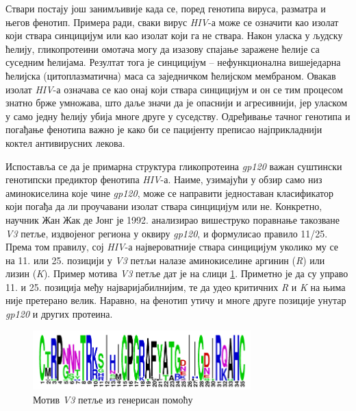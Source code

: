 \documentclass[12pt,oneside]{memoir}
\begin{document}
Ствари постају још занимљивије када се, поред генотипа вируса, разматра и његов фенотип. Примера ради, сваки вирус \textit{HIV}-а може се означити као изолат који ствара синцицијум или као изолат који га не ствара. Након уласка у људску ћелију, гликопротеини омотача могу да изазову спајање заражене ћелије са суседним ћелијама. Резултат тога је синцицијум -- нефункционална вишеједарна ћелијска (цитоплазматична) маса са заједничком ћелијском мембраном. Овакав изолат \textit{HIV}-а означава се као онај који ствара синцицијум и он се тим процесом знатно брже умножава, што даље значи да је опаснији и агресивнији, јер уласком у само једну ћелију убија многе друге у суседству. Одређивање тачног генотипа и погађање фенотипа важно је како би се пацијенту преписао најприкладнији коктел антивирусних лекова.

Испоставља се да је примарна структура гликопротеина \textit{gp120} важан суштински генотипски предиктор фенотипа \textit{HIV}-а. Наиме, узимајући у обзир само низ аминокиселина које чине \textit{gp120}, може се направити једноставан класификатор који погађа да ли проучавани изолат ствара синцицијум или не. Конкретно, научник Жан Жак де Јонг је 1992. анализирао вишеструко поравнање такозване \textit{V3} петље, издвојеног региона у оквиру \textit{gp120}, и формулисао правило 11/25. Према том правилу, сој \textit{HIV}-а највероватније ствара синцицијум уколико му се на 11. или 25. позицији у \textit{V3} петљи налазе аминокиселине аргинин (\textit{R}) или лизин (\textit{K}). Пример мотива \textit{V3} петље дат је на слици \ref{fig:motif}. Приметно је да су управо 11. и 25. позиција међу најваријабилнијим, те да удео критичних \textit{R} и \textit{K} на њима није претерано велик. Наравно, на фенотип утичу и многе друге позиције унутар \textit{gp120} и других протеина.

\begin{figure}[!ht]
  \centering
  \includegraphics[width=0.75\textwidth]{motif.png}
  \caption{Мотив \textit{V3} петље из \cite{compeau2015} генерисан помоћу \cite{weblogo}}
  \label{fig:motif}
\end{figure}
\end{document}
